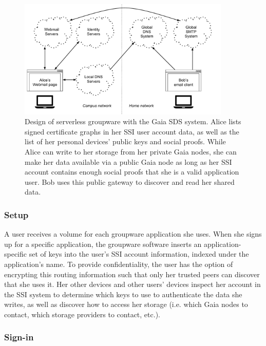 \begin{figure}[h]
   \centering
   \includegraphics[width=0.9\textwidth,page=23]{figures/dissertation-figures}
   \caption{Design of serverless groupware with the Gaia SDS system.  Alice
   lists signed certificate graphs in her SSI user account data, as well as the
   list of her personal devices' public keys and social proofs.  While Alice can
   write to her storage from her private Gaia nodes, she can make her data
   available via a public Gaia node as long as her SSI account contains enough
   social proofs that she is a valid application user.  Bob
   uses this public gateway to discover and read her shared data.}
   \label{fig:chap4-gaia-groupware}
\end{figure}

\subsubsection{Setup}

A user receives a volume for each groupware application she uses.  When she signs up for a specific
application, the groupware software inserts an application-specific set of keys
into the user's SSI account information, indexed under the application's name.  To provide
confidentiality, the user has the option of encrypting this routing information
such that only her trusted peers can discover that she uses it.  Her other
devices and other users' devices inspect her account in the SSI system to determine
which keys to use to authenticate the data she writes, as well as discover how
to access her storage (i.e. which Gaia nodes to contact, which storage providers
to contact, etc.).

\subsubsection{Sign-in}

